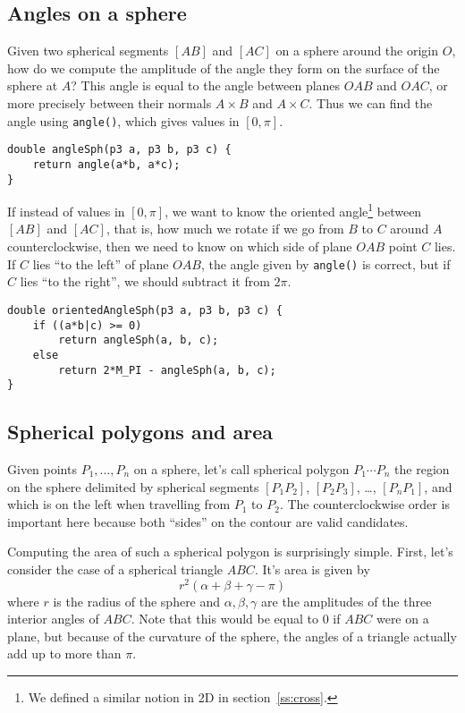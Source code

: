 \subsection{Angles on a sphere}
Given two spherical segments $[AB]$ and $[AC]$ on a sphere around the origin $O$, how do we compute the amplitude of the angle they form on the surface of the sphere at $A$? This angle is equal to the angle between planes $OAB$ and $OAC$, or more precisely between their normals $A \times B$ and $A \times C$. Thus we can find the angle using \lstinline|angle()|, which gives values in $[0,\pi]$.


\begin{lstlisting}
double angleSph(p3 a, p3 b, p3 c) {
    return angle(a*b, a*c);
}
\end{lstlisting}

If instead of values in $[0,\pi]$, we want to know the oriented angle\footnote{We defined a similar notion in 2D in section~\ref{ss:cross}.} between $[AB]$ and $[AC]$, that is, how much we rotate if we go from $B$ to $C$ around $A$ counterclockwise, then we need to know on which side of plane $OAB$ point $C$ lies. If $C$ lies ``to the left'' of plane $OAB$, the angle given by \lstinline|angle()| is correct, but if $C$ lies ``to the right'', we should subtract it from $2\pi$.


\begin{lstlisting}
double orientedAngleSph(p3 a, p3 b, p3 c) {
    if ((a*b|c) >= 0)
        return angleSph(a, b, c);
    else
        return 2*M_PI - angleSph(a, b, c);
}
\end{lstlisting}

\subsection{Spherical polygons and area}
Given points $P_1,\ldots,P_n$ on a sphere, let's call spherical polygon $P_1\cdots P_n$ the region on the sphere delimited by spherical segments $[P_1P_2]$, $[P_2P_3]$, \ldots, $[P_nP_1]$, and which is on the left when travelling from $P_1$ to $P_2$. The counterclockwise order is important here because both ``sides'' on the contour are valid candidates.


Computing the area of such a spherical polygon is surprisingly simple. First, let's consider the case of a spherical triangle $ABC$. It's area is given by
\[r^2(\alpha + \beta + \gamma - \pi)\]
where $r$ is the radius of the sphere and $\alpha,\beta,\gamma$ are the amplitudes of the three interior angles of $ABC$. Note that this would be equal to $0$ if $ABC$ were on a plane, but because of the curvature of the sphere, the angles of a triangle actually add up to more than $\pi$.

